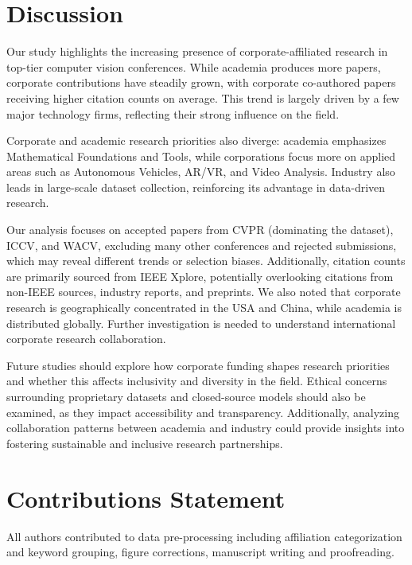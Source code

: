 \documentclass{article}
\begin{document}
\section{Discussion}
\vspace{-7pt}
Our study highlights the increasing presence of corporate-affiliated research in top-tier computer vision conferences. While academia produces more papers, corporate contributions have steadily grown, with corporate co-authored papers receiving higher citation counts on average. This trend is largely driven by a few major technology firms, reflecting their strong influence on the field.

Corporate and academic research priorities also diverge: academia emphasizes Mathematical Foundations and Tools, while corporations focus more on applied areas such as Autonomous Vehicles, AR/VR, and Video Analysis. Industry also leads in large-scale dataset collection, reinforcing its advantage in data-driven research.

Our analysis focuses on accepted papers from CVPR (dominating the dataset), ICCV, and WACV, excluding many other conferences and rejected submissions, which may reveal different trends or selection biases. Additionally, citation counts are primarily sourced from IEEE Xplore, potentially overlooking citations from non-IEEE sources, industry reports, and preprints. We also noted that corporate research is geographically concentrated in the USA and China, while academia is distributed globally. Further investigation is needed to understand international corporate research collaboration.

Future studies should explore how corporate funding shapes research priorities and whether this affects inclusivity and diversity in the field. Ethical concerns surrounding proprietary datasets and closed-source models should also be examined, as they impact accessibility and transparency. Additionally, analyzing collaboration patterns between academia and industry could provide insights into fostering sustainable and inclusive research partnerships.
\vspace{-7pt}
\section{Contributions Statement}
\vspace{-7pt}
All authors contributed to data pre-processing including affiliation categorization and keyword grouping, figure corrections, manuscript writing and proofreading. 
\end{document}
